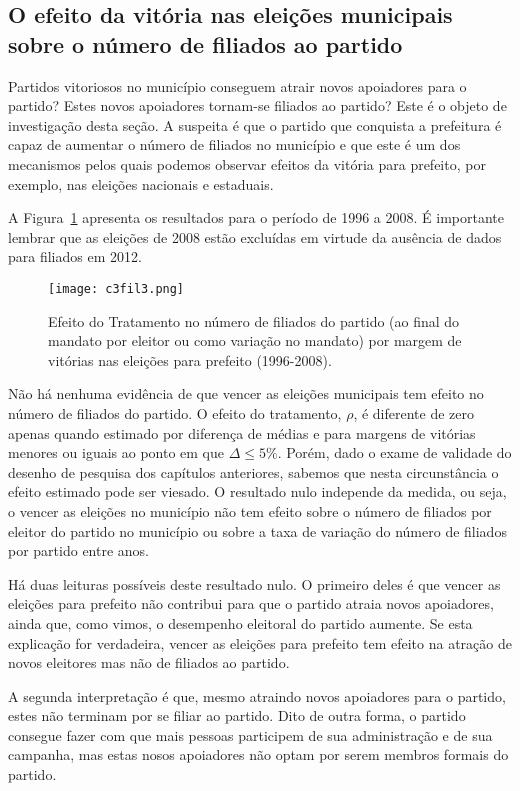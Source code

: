 \subsection{O efeito da vitória nas eleições municipais sobre o número de filiados ao partido}

Partidos vitoriosos no município conseguem atrair novos apoiadores para o partido? Estes novos apoiadores tornam-se filiados ao partido? Este é o objeto de investigação desta seção. A suspeita é que o partido que conquista a prefeitura é capaz de aumentar o número de filiados no município e que este é um dos mecanismos pelos quais podemos observar efeitos da vitória para prefeito, por exemplo, nas eleições nacionais e estaduais.

A Figura~\ref{fig:c3fil3} apresenta os resultados para o período de 1996 a 2008. É importante lembrar que as eleições de 2008 estão excluídas em virtude da ausência de dados para filiados em 2012.

\begin{figure}[htp]
	\centering
	\texttt{[image: c3fil3.png]}
	\caption{Efeito do Tratamento no número de filiados do partido (ao final do mandato por eleitor ou como variação no mandato) por margem de vitórias nas eleições para prefeito (1996-2008).}
	\label{fig:c3fil3}
\end{figure}

Não há nenhuma evidência de que vencer as eleições municipais tem efeito no número de filiados do partido. O efeito do tratamento, $\rho$, é diferente de zero apenas quando estimado por diferença de médias e para margens de vitórias menores ou iguais ao ponto em que $\Delta \leq 5\%$. Porém, dado o exame de validade do desenho de pesquisa dos capítulos anteriores, sabemos que nesta circunstância o efeito estimado pode ser viesado. O resultado nulo independe da medida, ou seja, o vencer as eleições no município não tem efeito sobre o número de filiados por eleitor do partido no município ou sobre a taxa de variação do número de filiados por partido entre anos.

Há duas leituras possíveis deste resultado nulo. O primeiro deles é que vencer as eleições para prefeito não contribui para que o partido atraia novos apoiadores, ainda que, como vimos, o desempenho eleitoral do partido aumente. Se esta explicação for verdadeira, vencer as eleições para prefeito tem efeito na atração de novos eleitores mas não de filiados ao partido.

A segunda interpretação é que, mesmo atraindo novos apoiadores para o partido, estes não terminam por se filiar ao partido. Dito de outra forma, o partido consegue fazer com que mais pessoas participem de sua administração e de sua campanha, mas estas nosos apoiadores não optam por serem membros formais do partido.


